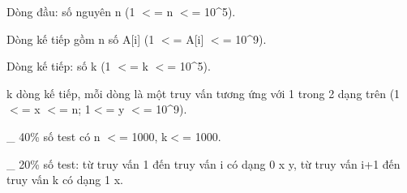 Dòng đầu: số nguyên n (1 $<$= n $<$= 10\textasciicircum5).

Dòng kế tiếp gồm n số A[i] (1 $<$= A[i] $<$= 10\textasciicircum9).

Dòng kế tiếp: số k (1 $<$= k $<$= 10\textasciicircum5).

k dòng kế tiếp, mỗi dòng là một truy vấn tương ứng với 1 trong 2 dạng trên (1 $<$= x $<$= n; 1$<$= y $<$= 10\textasciicircum9).

\_ 40\% số test có n $<$= 1000, k$<$= 1000.

\_ 20\% số test: từ truy vấn 1 đến truy vấn i có dạng 0 x y, từ truy vấn i+1 đến truy vấn k có dạng 1 x.